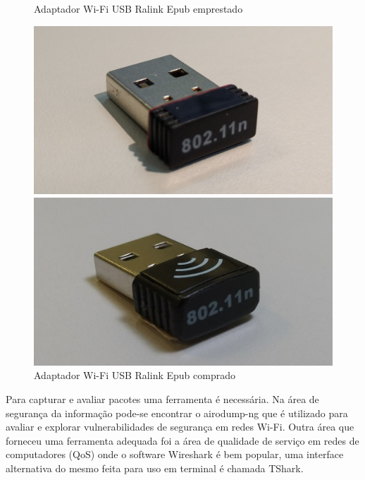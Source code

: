 \begin{figure}[htb]
 \label{adaptadores-usb-2}
  \begin{minipage}{0.45\textwidth}
	  \centering
	  \caption{Adaptador Wi-Fi USB Ralink Epub emprestado \label{fig-ralink-epub}}
	  \includegraphics[width=1\textwidth]{040-plataformas/RPi-WiFi-dongles/cut_ralink-epub.jpg}
  \end{minipage}
  \hfill
  \begin{minipage}{0.45\textwidth}
	  \centering
	  \caption{Adaptador Wi-Fi USB Ralink Epub comprado \label{fig-ralink}}
	  \includegraphics[width=1\textwidth]{040-plataformas/RPi-WiFi-dongles/cut_ralink.jpg}
  \end{minipage}
\end{figure}


Para capturar e avaliar pacotes uma ferramenta é necessária. Na área
de segurança da informação pode-se encontrar o airodump-ng que é utilizado para
avaliar e explorar vulnerabilidades de segurança em redes Wi-Fi. Outra área que
forneceu uma ferramenta adequada foi a área de qualidade de serviço em redes de
computadores (QoS) onde o software Wireshark é bem popular, uma interface alternativa
do mesmo feita para uso em terminal é chamada TShark.

